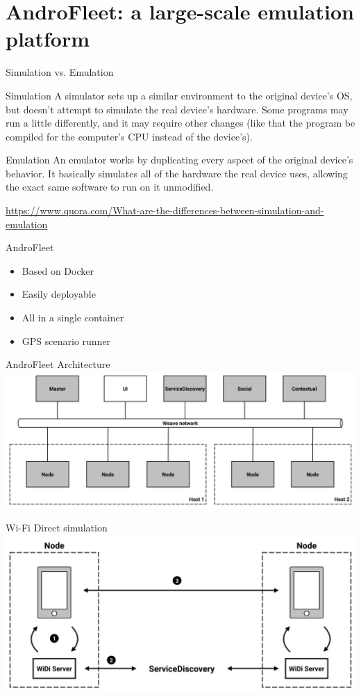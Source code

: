 \section{AndroFleet: a large-scale emulation platform}

\begin{frame}{Simulation vs. Emulation}
    \begin{block}{Simulation}
        A simulator sets up a similar environment to the original device's OS, but doesn't attempt to simulate the real device's hardware. 
        Some programs may run a little differently, and it may require other changes (like that the program be compiled for the computer's CPU instead of the device's).
    \end{block}
    \begin{alertblock}{Emulation}
        An emulator works by duplicating every aspect of the original device's behavior. 
        It basically simulates all of the hardware the real device uses, allowing the exact same software to run on it unmodified.
    \end{alertblock}
    \tiny{\url{https://www.quora.com/What-are-the-differences-between-simulation-and-emulation}}
\end{frame}

\begin{frame}{AndroFleet}
    \begin{itemize}
        \item Based on Docker
        \item Easily deployable
        \item All in a single container
        \item GPS scenario runner
    \end{itemize}
\end{frame}

\begin{frame}{AndroFleet Architecture}
    \includegraphics[width=\textwidth]{figures/androfleet}
\end{frame}

\begin{frame}{Wi-Fi Direct simulation}
    \includegraphics[width=\textwidth]{figures/widi}
\end{frame}

